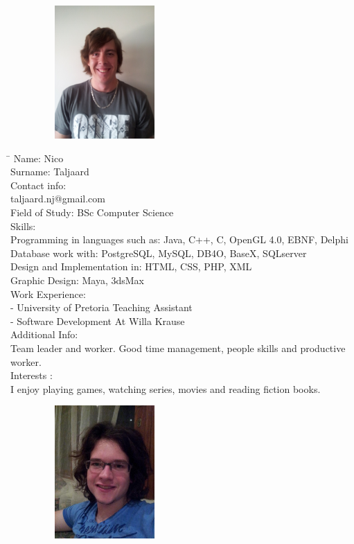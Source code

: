 \documentclass[12pt]{article}
\begin{document}
	\newpage
	\begin{figure}[ht!]
		\centering
		\includegraphics[width=2in, height=2in]{./Pictures/NicoTaljaard.jpg}
	\end{figure}
	
	\begin{tabbing}
		\hspace*{3.5cm}\=\hspace*{3cm} \kill
		Name: \> Nico \\
		Surname: \> Taljaard \\
		Contact info:  \\
			\> taljaard.nj@gmail.com \\
		Field of Study: \>  BSc Computer Science \\
		Skills:	 \>\\		
			\>	Programming in languages such as: Java, C++, C, OpenGL 4.0, EBNF, Delphi \\
			\>	Database work with: PostgreSQL, MySQL, DB4O, BaseX, SQLserver \\
			\>	Design and Implementation in: HTML, CSS, PHP, XML \\ 
			\>	Graphic Design: Maya, 3dsMax \\				
		Work Experience:	\\		
			 - University of Pretoria Teaching Assistant \\
			 - Software Development At Willa Krause \\
		Additional Info: \\
		\> Team leader and worker. Good time management, people skills and productive \\ \> worker. \\
		Interests : \\
		\> I enjoy playing games, watching series, movies and reading fiction books. \\
	\end{tabbing}
	
	\newpage
	\begin{figure}[ht!]
		\centering
		\includegraphics[width=2in, height=2in]{./Pictures/MathysEllis.jpg}
	\end{figure}
\end{document}
